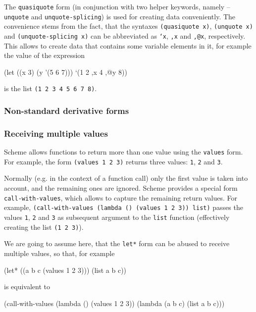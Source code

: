 The \texttt{quasiquote} form (in conjunction with two helper keywords,
namely -- \texttt{unquote} and \texttt{unquote-splicing}) is used
for creating data conveniently. The convenience stems from the fact,
that the syntaxes \texttt{(quasiquote x)}, \texttt{(unquote x)} and
\texttt{(unquote-splicing x)} can be abbreviated as \texttt{`x},
\texttt{,x} and \texttt{,@x}, respectively. This allows to create
data that contains some variable elements in it, for example the
value of the expression
\begin{Snippet}
(let ((x 3)
      (y '(5 6 7)))
  `(1 2 ,x 4 ,@y 8))
\end{Snippet}
is the list \texttt{(1 2 3 4 5 6 7 8)}.

\subsubsection{Non-standard derivative forms}

\subsubsection{Receiving multiple values}

Scheme allows functions to return more than one value using the
\texttt{values} form. For example, the form \texttt{(values 1 2 3)}
returns three values: \texttt{1}, \texttt{2} and \texttt{3}.

Normally (e.g. in the context of a function call) only the first
value is taken into account, and the remaining ones are ignored.
Scheme provides a special form \texttt{call-with-values},
which allows to capture the remaining return values. For example,
\texttt{(call-with-values (lambda () (values 1 2 3)) list)} passes
the values \texttt{1}, \texttt{2} and \texttt{3} as subsequent argument
to the \texttt{list} function (effectively creating the list \texttt{(1 2 3)}).

We are going to assume here, that the \texttt{let*} form can be abused
to receive multiple values\cite{SRFI-71}, so that, for example

\begin{Snippet}
(let* ((a b c (values 1 2 3)))
  (list a b c))
\end{Snippet}

is equivalent to

\begin{Snippet}
(call-with-values
  (lambda () (values 1 2 3))
  (lambda (a b c) (list a b c)))
\end{Snippet}

